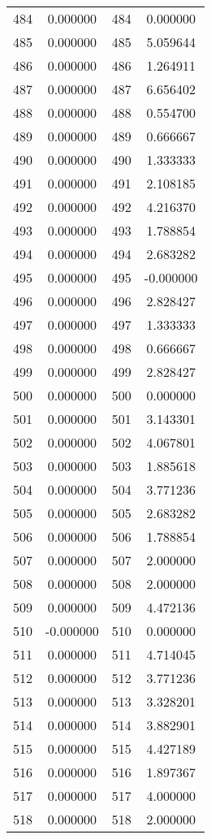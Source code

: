 \documentclass[12pt]{article}
\begin{document}
\begin{longtable}{@{}cccc@{}}
484 & 0.000000 & 484 & 0.000000 \\
485 & 0.000000 & 485 & 5.059644 \\
486 & 0.000000 & 486 & 1.264911 \\
487 & 0.000000 & 487 & 6.656402 \\
488 & 0.000000 & 488 & 0.554700 \\
489 & 0.000000 & 489 & 0.666667 \\
490 & 0.000000 & 490 & 1.333333 \\
491 & 0.000000 & 491 & 2.108185 \\
492 & 0.000000 & 492 & 4.216370 \\
493 & 0.000000 & 493 & 1.788854 \\
494 & 0.000000 & 494 & 2.683282 \\
495 & 0.000000 & 495 & -0.000000 \\
496 & 0.000000 & 496 & 2.828427 \\
497 & 0.000000 & 497 & 1.333333 \\
498 & 0.000000 & 498 & 0.666667 \\
499 & 0.000000 & 499 & 2.828427 \\
500 & 0.000000 & 500 & 0.000000 \\
501 & 0.000000 & 501 & 3.143301 \\
502 & 0.000000 & 502 & 4.067801 \\
503 & 0.000000 & 503 & 1.885618 \\
504 & 0.000000 & 504 & 3.771236 \\
505 & 0.000000 & 505 & 2.683282 \\
506 & 0.000000 & 506 & 1.788854 \\
507 & 0.000000 & 507 & 2.000000 \\
508 & 0.000000 & 508 & 2.000000 \\
509 & 0.000000 & 509 & 4.472136 \\
510 & -0.000000 & 510 & 0.000000 \\
511 & 0.000000 & 511 & 4.714045 \\
512 & 0.000000 & 512 & 3.771236 \\
513 & 0.000000 & 513 & 3.328201 \\
514 & 0.000000 & 514 & 3.882901 \\
515 & 0.000000 & 515 & 4.427189 \\
516 & 0.000000 & 516 & 1.897367 \\
517 & 0.000000 & 517 & 4.000000 \\
518 & 0.000000 & 518 & 2.000000 \\

\end{longtable}
\end{document}
